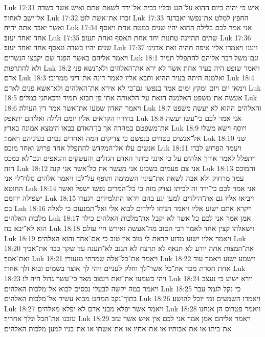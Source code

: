 Luk 17:31  איש כי יהיה ביום ההוא על־הגג וכליו בבית אל־ירד לשאת אתם ואיש אשר בשדה אל־ישב לאחור׃
Luk 17:32  זכרו את־אשת לוט׃
Luk 17:33  החפץ למלט את־נפשו יאבדנה ואשר יאבד אתה יחיה׃
Luk 17:34  אני אמר לכם בלילה ההוא יהיו שנים במטה אחת ויאסף אחד ואחד יעזב׃
Luk 17:35  שתים תהיינה טחנות יחד אחת תאסף ואחת תעזב׃
Luk 17:36  שנים יהיו בשדה ונאסף אחד ואחד יעזב׃
Luk 17:37  ויענו ויאמרו אליו איפה תהיה זאת אדנינו ויאמר אליהם באשר הפגר שם יקבצו הנשרים׃
Luk 18:1  וגם־משל דבר אליהם להתפלל תמיד ולא להתרפות׃
Luk 18:2  ויאמר שופט היה בעיר אחת אשר לא ירא את־האלהים ולא־נשא פני אדם׃
Luk 18:3  ואלמנה היתה בעיר ההיא ותבא אליו לאמר דינה את־דיני ממריבי׃
Luk 18:4  וימאן יום ויום ומקץ ימים אמר בנפשו גם־כי לא אירא את־האלהים ולא־אשא פנים לאדם׃
Luk 18:5  אעשה את־משפט האלמנה הזאת על־הלאותה אתי פן־תבוא תמיד ודכאתני במלים׃
Luk 18:6  ויאמר האדון שמעו את־אשר אמר דין העולה׃
Luk 18:7  והאלהים ההוא לא יעשה משפט בחיריו הקראים אליו יומם ולילה ואליהם יתאפק׃
Luk 18:8  אני אמר לכם כי־עשו יעשה את־משפטם במהרה אך בן־האדם בבאו הימצא אמונה בארץ׃
Luk 18:9  ויוסף וישא משלו אל־אנשים בטחים בנפשם כי צדיקים המה ואחרים נבזים בעיניהם ויאמר׃
Luk 18:10  שני אנשים עלו אל־המקדש להתפלל אחד פרוש ואחד מוכס׃
Luk 18:11  ויעמד הפרוש לבדו ויתפלל לאמר אודך אלהים על כי אינני כיתר האדם הגזלים והעשקים והנאפים וגם־לא כמכס הזה׃
Luk 18:12  אני צם פעמים בשבוע אני מעשר את כל־אשר אני קנה׃
Luk 18:13  והמוכס עמד מרחוק ולא אבה לשאת את־עיניו השמימה ותופף על־לבו ויאמר אלהים סלח־לי אני החוטא׃
Luk 18:14  אני אמר לכם כי־ירד זה לביתו נצדק מזה כי כל־המרים נפשו ישפל ואשר ישפילה ירומם׃
Luk 18:15  ויביאו אליו גם את־הילדים למען יגע בהם ויראו התלמידים ויגערו בם׃
Luk 18:16  ויקרא אתם ישוע אליו ויאמר הניחו לילדים לבוא אלי ואל־תמנעום כי לאלה מלכות האלהים׃
Luk 18:17  אמן אמר אני לכם כל אשר לא יקבל את־מלכות האלהים כילד הוא לא־יבא בה׃
Luk 18:18  וישאלהו קצין אחד לאמר רבי הטוב מה־אעשה ואירש חיי עולם׃
Luk 18:19  ויאמר אליו ישוע מדוע קראת לי טוב אין טוב כי אם־אחד והוא האלהים׃
Luk 18:20  את־המצות אתה יודע לא תנאף לא תרצח לא תגנב לא־תענה עד שקר כבד את־אביך ואת־אמך׃
Luk 18:21  ויאמר את־כל־אלה שמרתי מנעורי׃
Luk 18:22  וישמע ישוע ויאמר עוד אחת חסרת מכר את־כל אשר־לך וחלק לעניים ויהי לך אוצר בשמים ובוא ולך אחרי׃
Luk 18:23  ויהי כשמעו את־זאת ויעצב מאד כי־עשר גדול היה לו׃
Luk 18:24  וירא ישוע כי נעצב ויאמר כמה יקשה לבעלי נכסים לבוא אל־מלכות האלהים׃
Luk 18:25  כי נקל לגמל עבר בתוך־נקב המחט מבוא עשיר אל־מלכות האלהים׃
Luk 18:26  ויאמרו השמעים ומי יוכל להושע׃
Luk 18:27  ויאמר אשר יפלא מבני אדם לא יפלא מאלהים׃
Luk 18:28  ויאמר פטרוס הן אנחנו עזבנו את־הכל ונלך אחריך׃
Luk 18:29  ויאמר אליהם אמן אמר אני לכם אין איש אשר עזב את־ביתו או את־אבותיו או את־אחיו או את־אשתו או את־בניו למען מלכות האלהים׃
